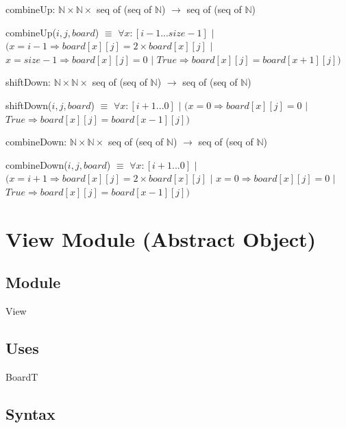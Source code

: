 \documentclass[12pt]{article}
\begin{document}
\bigskip
\bigskip

\noindent combineUp: $\mathbb{N} \times \mathbb{N} \times$ seq of (seq of $\mathbb{N}$) $\rightarrow$ seq of (seq of $\mathbb{N}$)

\medskip

\noindent combineUp($i, j, board$) $\equiv$ $\forall x : [i-1...size-1]$ $|$ $(x = i-1 \Rightarrow board[x][j] = 2 \times board[x][j]$ $|$ $x = size-1 \Rightarrow board[x][j] = 0$ $|$ $True \Rightarrow board[x][j] = board[x+1][j])$

\bigskip
\bigskip

\noindent shiftDown: $\mathbb{N} \times \mathbb{N} \times$ seq of (seq of $\mathbb{N}$) $\rightarrow$ seq of (seq of $\mathbb{N}$) 

\medskip

\noindent shiftDown($i, j, board$) $\equiv$ $\forall x : [i+1...0]$ $|$ $(x = 0 \Rightarrow board[x][j] = 0$ $|$ $True \Rightarrow board[x][j] = board[x-1][j])$

\bigskip
\bigskip

\noindent combineDown: $\mathbb{N} \times \mathbb{N} \times$ seq of (seq of $\mathbb{N}$) $\rightarrow$ seq of (seq of $\mathbb{N}$)

\medskip

\noindent combineDown($i, j, board$) $\equiv$ $\forall x : [i+1...0]$ $|$ $(x = i+1 \Rightarrow board[x][j] = 2 \times board[x][j]$ $|$ $x = 0 \Rightarrow board[x][j] = 0$ $|$ $True \Rightarrow board[x][j] = board[x-1][j])$

\bigskip
\bigskip


\newpage

\section* {View Module (Abstract Object)}

\subsection* {Module}

View

\subsection* {Uses}

BoardT

\subsection* {Syntax}
\end{document}
